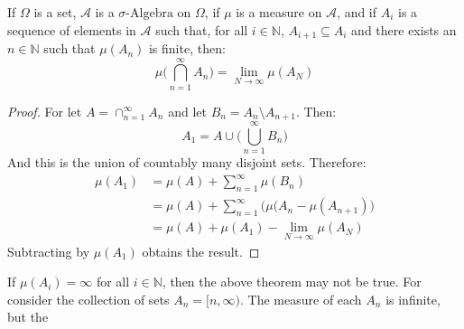                     \begin{theorem}
                        If $\Omega$ is a set, $\mathcal{A}$ is a
                        $\sigma\text{-Algebra}$ on $\Omega$, if
                        $\mu$ is a measure on $\mathcal{A}$, and if
                        $A_{i}$ is a sequence of elements in $\mathcal{A}$
                        such that, for all $i\in\mathbb{N}$,
                        $A_{i+1}\subseteq{A}_{i}$ and there exists an
                        $n\in\mathbb{N}$ such that $\mu(A_{n})$ is finite,
                        then:
                        \begin{equation}
                            \mu\Big(\bigcap_{n=1}^{\infty}A_{n}\Big)
                            =\underset{N\rightarrow\infty}{\lim}
                            \mu(A_{N})
                        \end{equation}
                    \end{theorem}
                    \begin{proof}
                        For let $A=\cap_{n=1}^{\infty}A_{n}$ and let
                        $B_{n}=A_{n}\setminus{A}_{n+1}$. Then:
                        \begin{equation}
                            A_{1}=
                            A\cup\big(\bigcup_{n=1}^{\infty}B_{n}\Big)
                        \end{equation}
                        And this is the union of countably many disjoint
                        sets. Therefore:
                        \begin{align}
                            \mu(A_{1})&=
                            \mu(A)+\sum_{n=1}^{\infty}\mu(B_{n})\\
                            &=\mu(A)+\sum_{n=1}^{\infty}
                            \Big(\mu(A_{n}-\mu(A_{n+1})\Big)\\
                            &=\mu(A)+\mu(A_{1})-
                            \underset{N\rightarrow\infty}{\lim}\mu(A_{N})
                        \end{align}
                        Subtracting by $\mu(A_{1})$ obtains the result.
                    \end{proof}
                    If $\mu(A_{i})=\infty$ for all $i\in\mathbb{N}$, then
                    the above theorem may not be true. For consider
                    the collection of sets $A_{n}=[n,\infty)$. The
                    measure of each $A_{n}$ is infinite, but the
